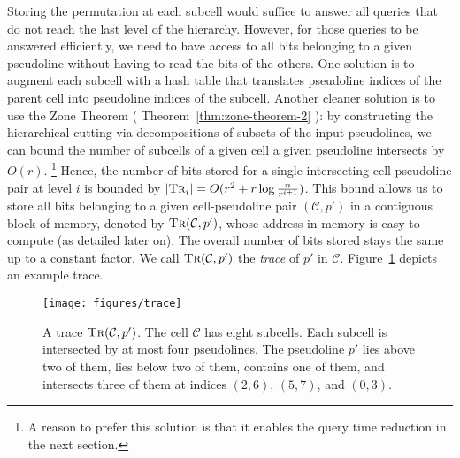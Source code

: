 Storing the permutation at each subcell would suffice to answer all
queries that do not reach the last level of the hierarchy. However,
for those queries to be answered efficiently,
we need to have access to all bits belonging to a given pseudoline
without having to read the bits of the others.
%
One solution is to augment each subcell with a hash table that translates
pseudoline indices of the parent cell into pseudoline indices of the subcell.
%
Another cleaner solution is to use the Zone Theorem
(%
\ifjournal%
Theorem~\ref{thm:zone-theorem-2}%
\else%
\cite{BEPY90,CGL85,Go04}%
\fi%
): by constructing the hierarchical cutting
via decompositions of subsets of the input pseudolines, we can bound
the number of subcells of a given cell a given pseudoline intersects by
\(O(r)\).%
\footnote{A reason to prefer this solution is that it enables the query time
reduction in the next section.}
%
Hence,
the number of bits stored for a single intersecting cell-pseudoline
pair at level \(i\) is bounded by
\(|\textsc{Tr}_i| = O(r^2 + r \log{\frac{n}{r^{i+1}}})\).
This bound allows us to store all bits belonging to a given cell-pseudoline pair
\((\mathcal{C},p')\)
in a contiguous block of memory, denoted by \(\textsc{Tr}(\mathcal{C},p')\),
whose address in memory is easy to compute (as detailed later on).
%
The overall number of bits stored stays the same up to a constant factor.
%
We call
\(\textsc{Tr}(\mathcal{C},p')\) the \emph{trace} of \(p'\) in \(\mathcal{C}\).
Figure~\ref{fig:trace} depicts an example trace.
%
\begin{figure}
  \centering{}
  \texttt{[image: figures/trace]}
  \caption{%
	  A trace \(\textsc{Tr}(\mathcal{C}, p')\). The cell \(\mathcal{C}\) has
	  eight subcells. Each subcell is intersected by at most four pseudolines.
	  The pseudoline \(p'\) lies above two of them, lies below two of them,
	  contains one of them, and intersects three of them at indices
	  \((2,6)\), \((5,7)\), and \((0, 3)\).
  }\label{fig:trace}
\end{figure}
%

